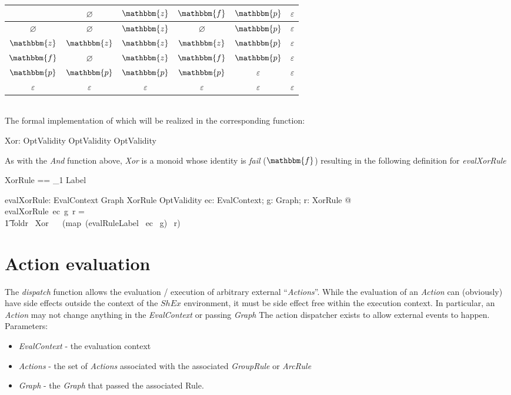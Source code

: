 \documentclass[fuzz]{llncs}
\def\pass{{\mathbbm{p}}}
\def\fail{{\mathbbm{f}}}
\def\dunno{\varnothing}
\def\error{\varepsilon}
\def\nomatch{\mathbbm{z}}
\def\zc{\textit}
\def\zcb{\textit{\textbf}}
\begin{document}
\begin{tabular}{c || c | c | c | c | c |}
   \hline
   \zcb{Xor} & $\dunno$ & $\nomatch$ & $\fail$ & $\pass$ & $\error$ \\
   \hline \hline
   $\dunno$ & $\dunno$ & $\nomatch$ & $\dunno$ & $\pass$ & $\error$ \\ \hline
   $\nomatch$ & $\nomatch$ & $\nomatch$ & $\nomatch$ & $\pass$ & $\error$ \\ \hline
   $\fail$ & $\dunno$ & $\nomatch$ & $\fail$ & $\pass$ & $\error$ \\ \hline
   $\pass$ & $\pass$ & $\pass$ & $\pass$ & $\error$ & $\error$ \\ \hline
   $\error$ & $\error$ & $\error$ & $\error$ & $\error$ & $\error$ \\ \hline 
\end{tabular}
\\
The formal implementation of which will be realized in the corresponding function:
\begin{gendef}
   Xor: OptValidity \fun OptValidity \fun OptValidity
\end{gendef}
As with the \zc{And} function above, \zc{Xor} is a monoid whose identity is \zc{fail} ($\fail$)
resulting in the following definition for \zc{evalXorRule}
\begin{zed}
XorRule == \seq_1 Label
\end{zed}
\begin{gendef}
   evalXorRule: EvalContext \fun Graph \fun XorRule \fun OptValidity
\where
   \forall ec: EvalContext; g: Graph; r: XorRule  @ \\
	evalXorRule~ec~g~r = \\
\t1	foldr~ Xor~ \fail ~ (map~(evalRuleLabel~ ec ~g)~ r)
\end{gendef}

\section{Action evaluation}
The \zc{dispatch} function allows the evaluation / execution of arbitrary external ``\zc{Actions}''.  While the evaluation of an \zc{Action} can (obviously) have side effects
outside the context of the $ShEx$ environment, it must be side effect free within the 
execution context.  In particular, an \zc{Action} may not change anything in the 
\zc{EvalContext} or passing \zc{Graph}
The action dispatcher exists to allow external events to happen. Parameters:
\begin{itemize}
\item \zc{EvalContext} - the evaluation context
\item \zc{Actions} - the set of \zc{Actions} associated with the associated \zc{GroupRule} or \zc{ArcRule}
\item \zc{Graph} - the \zc{Graph} that passed the associated Rule.
\end{itemize}
\end{document}
